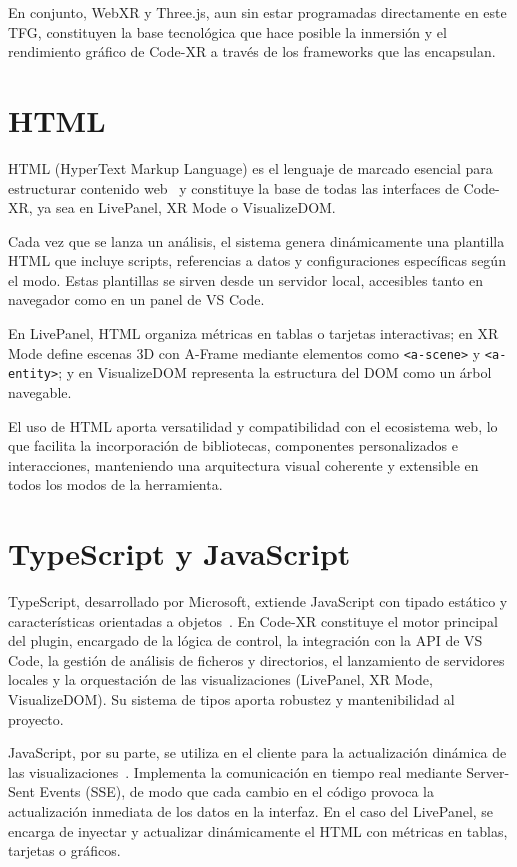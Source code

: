 \documentclass[a4paper, 12pt]{book}
\begin{document}
En conjunto, WebXR y Three.js, aun sin estar programadas directamente en este TFG, constituyen la base tecnológica que hace posible la inmersión y el rendimiento gráfico de Code-XR a través de los frameworks que las encapsulan.


\section{HTML}
\label{sec:html}

HTML (HyperText Markup Language) es el lenguaje de marcado esencial para estructurar contenido web~\cite{html} y constituye la base de todas las interfaces de Code-XR, ya sea en LivePanel, XR Mode o VisualizeDOM.  

Cada vez que se lanza un análisis, el sistema genera dinámicamente una plantilla HTML que incluye scripts, referencias a datos y configuraciones específicas según el modo. Estas plantillas se sirven desde un servidor local, accesibles tanto en navegador como en un panel de VS Code.  

En LivePanel, HTML organiza métricas en tablas o tarjetas interactivas; en XR Mode define escenas 3D con A-Frame mediante elementos como \texttt{<a-scene>} y \texttt{<a-entity>}; y en VisualizeDOM representa la estructura del DOM como un árbol navegable.  

El uso de HTML aporta versatilidad y compatibilidad con el ecosistema web, lo que facilita la incorporación de bibliotecas, componentes personalizados e interacciones, manteniendo una arquitectura visual coherente y extensible en todos los modos de la herramienta.

\section{TypeScript y JavaScript}
\label{sec:typescript-javascript}

TypeScript, desarrollado por Microsoft, extiende JavaScript con tipado estático y características orientadas a objetos~\cite{typescript}. En Code-XR constituye el motor principal del plugin, encargado de la lógica de control, la integración con la API de VS Code, la gestión de análisis de ficheros y directorios, el lanzamiento de servidores locales y la orquestación de las visualizaciones (LivePanel, XR Mode, VisualizeDOM). Su sistema de tipos aporta robustez y mantenibilidad al proyecto.

JavaScript, por su parte, se utiliza en el cliente para la actualización dinámica de las visualizaciones~\cite{javascript}. Implementa la comunicación en tiempo real mediante Server-Sent Events (SSE), de modo que cada cambio en el código provoca la actualización inmediata de los datos en la interfaz. En el caso del LivePanel, se encarga de inyectar y actualizar dinámicamente el HTML con métricas en tablas, tarjetas o gráficos.
\end{document}
